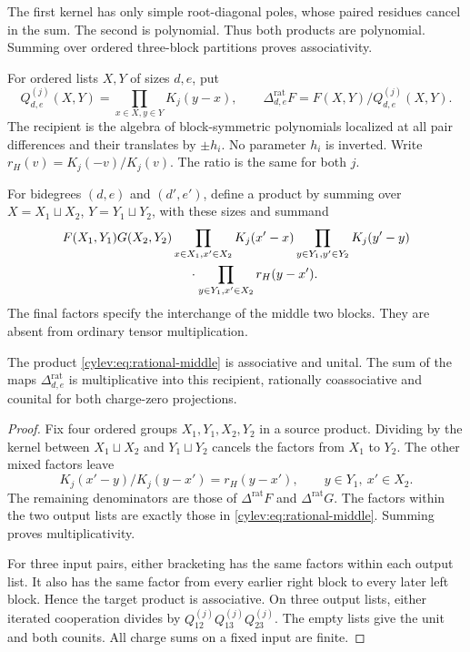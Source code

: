 The first kernel has only simple root-diagonal poles, whose paired
residues cancel in the sum. The second is polynomial.
Thus both products are polynomial.
Summing over ordered three-block partitions proves associativity.

For ordered lists $X,Y$ of sizes $d,e$, put
\[
 Q^{(j)}_{d,e}(X,Y)=\prod_{x\in X,y\in Y}K_j(y-x),\qquad
 \Delta^{\mathrm{rat}}_{d,e}F
                      =F(X,Y)/Q^{(j)}_{d,e}(X,Y).
\]
The recipient is the algebra of block-symmetric polynomials localized
at all pair differences and their translates by $\pm h_i$.
No parameter $h_i$ is inverted.
Write $r_H(v)=K_j(-v)/K_j(v)$. The ratio is the same for both $j$.

For bidegrees $(d,e)$ and $(d',e')$, define a product by summing over
$X=X_1\sqcup X_2$, $Y=Y_1\sqcup Y_2$, with these sizes and summand
\begin{equation}\label{cylev:eq:rational-middle}
\begin{split}
 &F(X_1,Y_1)G(X_2,Y_2)
   \prod_{x\in X_1,x'\in X_2}K_j(x'-x)
   \prod_{y\in Y_1,y'\in Y_2}K_j(y'-y)\\
 &\hspace{35mm}\cdot
   \prod_{y\in Y_1,x'\in X_2}r_H(y-x').
\end{split}
\end{equation}
The final factors specify the interchange of the middle two blocks.
They are absent from ordinary tensor multiplication.

\begin{proposition}\label{cylev:prop:rational-hall}
The product \eqref{cylev:eq:rational-middle} is associative and
unital. The sum of the maps $\Delta^{\mathrm{rat}}_{d,e}$ is
multiplicative into this recipient, rationally coassociative and
counital for both charge-zero projections.
\end{proposition}
\begin{proof}
Fix four ordered groups $X_1,Y_1,X_2,Y_2$ in a source product.
Dividing by the kernel between $X_1\sqcup X_2$ and $Y_1\sqcup Y_2$
cancels the factors from $X_1$ to $Y_2$.
The other mixed factors leave
\[
 K_j(x'-y)/K_j(y-x')=r_H(y-x'),
       \qquad y\in Y_1,\ x'\in X_2.
\]
The remaining denominators are those of $\Delta^{\mathrm{rat}}F$
and $\Delta^{\mathrm{rat}}G$.
The factors within the two output lists are exactly those in
\eqref{cylev:eq:rational-middle}.
Summing proves multiplicativity.

For three input pairs, either bracketing has the same factors within
each output list.
It also has the same factor from every earlier right block to every
later left block. Hence the target product is associative.
On three output lists, either iterated cooperation divides by
$Q_{12}^{(j)}Q_{13}^{(j)}Q_{23}^{(j)}$.
The empty lists give the unit and both counits.
All charge sums on a fixed input are finite.
\end{proof}


